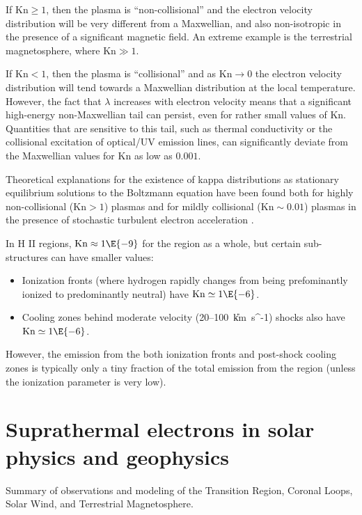 \documentclass{emulateapj}
\newcommand\Kn{\ensuremath{\mathrm{Kn}}}
\newcommand\kms{\U{km\ s^{-1}}}
\begin{document}
If \(\Kn \ge 1\), then the plasma is ``non-collisional'' and the
electron velocity distribution will be very different from a
Maxwellian, and also non-isotropic in the presence of a significant
magnetic field.  An extreme example is the terrestrial magnetosphere,
where \(\Kn \gg 1\).  

If \(\Kn < 1\), then the plasma is ``collisional'' and as \(\Kn \to
0\) the electron velocity distribution will tend towards a Maxwellian
distribution at the local temperature.  However, the fact that
\(\lambda\) increases with electron velocity means that a significant
high-energy non-Maxwellian tail can persist, even for rather small
values of \Kn.  Quantities that are sensitive to this tail, such as
thermal conductivity or the collisional excitation of optical/UV
emission lines, can significantly deviate from the Maxwellian values
for \Kn{} as low as \(0.001\). 

Theoretical explanations for the existence of kappa distributions as
stationary equilibrium solutions to the Boltzmann equation have been
found both for highly non-collisional (\(\Kn > 1\)) plasmas \citep{Pierrard:2010a,
  Livadiotis:2013a} and for mildly collisional (\(\Kn \sim 0.01\))
plasmas in the presence of stochastic turbulent electron acceleration \citep{Bian:2014a}.


In H II regions, \(\Kn \approx 1\E{-9} \) for the region as a whole, but
certain sub-structures can have smaller values:
\begin{itemize}
\item Ionization fronts (where hydrogen rapidly changes from being
  prefominantly ionized to predominantly neutral) have \(\Kn \simeq
  1\E{-6}\). 
\item Cooling zones behind moderate velocity (20--100~\kms) shocks
  also have \(\Kn \simeq 1\E{-6}\). 
\end{itemize}
However, the emission from the both ionization fronts and post-shock
cooling zones is typically only a tiny fraction of the total emission
from the region (unless the ionization parameter is very low).



\section{Suprathermal electrons in solar physics and geophysics}
\label{sec:supr-electr-solar}

Summary of observations and modeling of the Transition Region, Coronal
Loops, Solar Wind, and Terrestrial Magnetosphere.
\end{document}
